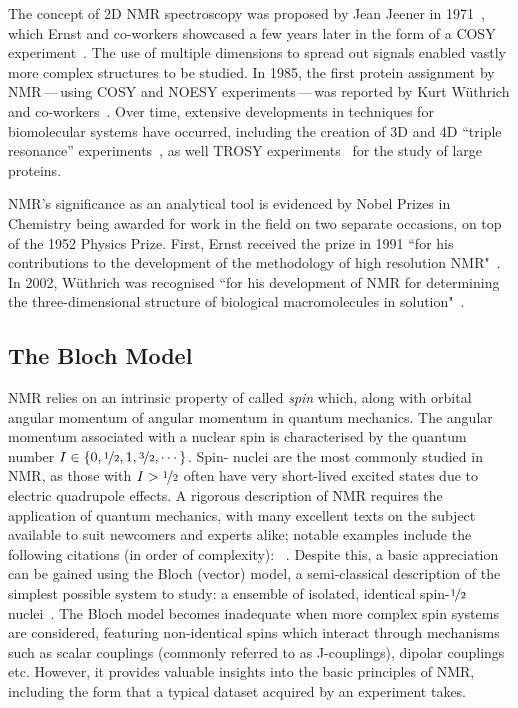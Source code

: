 The concept of \ac{2D} \ac{NMR} spectroscopy was proposed by Jean Jeener in
1971~\cite{Jeener1971, Jeener2016}, which Ernst and co-workers showcased a few
years later in the form of a \ac{COSY} experiment~\cite{Aue1976a}. The use of
multiple dimensions to spread out signals enabled vastly more complex
structures to be studied. In 1985, the first protein assignment by
\ac{NMR}\,---\,using \ac{COSY} and \ac{NOESY} experiments\,---\,was reported
by Kurt W\"uthrich and co-workers~\cite{Williamson1985}. Over time, extensive
developments in techniques for biomolecular systems have occurred, including
the creation of 3D and 4D ``triple resonance'' experiments~\cite{Marion1989,
Kay1990}, as well \ac{TROSY} experiments~\cite{Pervushin1997} for the study of
large proteins.

\ac{NMR}'s significance as an analytical tool is evidenced by Nobel Prizes in
Chemistry being awarded for work in the field on two separate occasions, on top
of the 1952 Physics Prize. First,
Ernst received the prize in 1991 ``for his contributions to the development of
the methodology of high resolution \acl{NMR}"~\cite{Ernst1992}. In 2002,
W\"uthrich was recognised ``for his development of \acl{NMR} for determining
the three-dimensional structure of biological macromolecules in
solution"~\cite{Wuthrich2003}.

\subsection{The Bloch Model}

\ac{NMR} relies on an intrinsic property of \label{corr:prot-neut} called \textit{spin}
which, along with orbital angular momentum \label{corr:mol-rot} of angular momentum in quantum mechanics.
The angular momentum associated with a nuclear spin is characterised by the
quantum number $I \in \lbrace 0, \nicefrac{1}{2}, 1, \nicefrac{3}{2}, \cdots
\rbrace$. Spin-
nuclei are the most commonly studied in \ac{NMR}, as those with $I >
\nicefrac{1}{2}$ often have very short-lived excited states due to electric
quadrupole effects. A rigorous description of \ac{NMR} requires the application
of quantum mechanics, with many excellent texts on the subject available to
suit newcomers and experts alike; notable examples include the
following citations (in order of complexity):
~\cite{Hore2015,Levitt2007,Cavanagh2007,Goldman1988,Abragam1961}.
Despite this, a basic
appreciation can be gained using the Bloch (vector) model, a semi-classical
description of the simplest possible system to study: a ensemble of
isolated, identical spin-$\nicefrac{1}{2}$ nuclei~\cite[Chapter 1]{Hore2015}.
The Bloch model becomes inadequate when more complex spin systems are
considered, featuring non-identical spins which interact through mechanisms
such as scalar couplings (commonly referred to as J-couplings), dipolar
couplings etc. However, it provides valuable insights into the basic principles
of \ac{NMR}, including the form that a typical dataset acquired by an
experiment takes.

